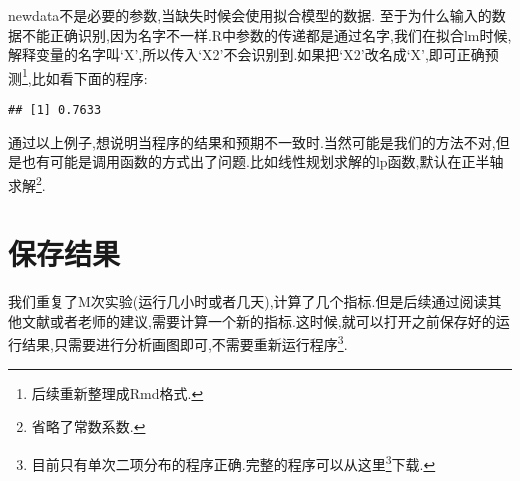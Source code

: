 \documentclass[]{ctexbook}
\newenvironment{Shaded}{\begin{snugshade}}{\end{snugshade}}
\newcommand{\DataTypeTok}[1]{\textcolor[rgb]{0.13,0.29,0.53}{#1}}
\newcommand{\DecValTok}[1]{\textcolor[rgb]{0.00,0.00,0.81}{#1}}
\newcommand{\FloatTok}[1]{\textcolor[rgb]{0.00,0.00,0.81}{#1}}
\newcommand{\KeywordTok}[1]{\textcolor[rgb]{0.13,0.29,0.53}{\textbf{#1}}}
\newcommand{\NormalTok}[1]{#1}
\newcommand{\OperatorTok}[1]{\textcolor[rgb]{0.81,0.36,0.00}{\textbf{#1}}}
\newcommand{\StringTok}[1]{\textcolor[rgb]{0.31,0.60,0.02}{#1}}
\renewcommand{\href}[2]{#2\footnote{\url{#1}}}
\begin{document}
newdata不是必要的参数,当缺失时候会使用拟合模型的数据.
至于为什么输入的数据不能正确识别,因为名字不一样.R中参数的传递都是通过名字,我们在拟合lm时候,解释变量的名字叫`X',所以传入`X2'不会识别到.如果把`X2'改名成`X',即可正确预测\footnote{后续重新整理成Rmd格式.},比如看下面的程序:

\begin{Shaded}
\end{Shaded}

\begin{verbatim}
## [1] 0.7633
\end{verbatim}

通过以上例子,想说明当程序的结果和预期不一致时.当然可能是我们的方法不对,但是也有可能是调用函数的方式出了问题.比如线性规划求解的lp函数,默认在正半轴求解\footnote{省略了常数系数.}.

\hypertarget{section-6}{%
\section{保存结果}\label{section-6}}

我们重复了M次实验(运行几小时或者几天),计算了几个指标.但是后续通过阅读其他文献或者老师的建议,需要计算一个新的指标.这时候,就可以打开之前保存好的运行结果,只需要进行分析画图即可,不需要重新运行程序\footnote{目前只有单次二项分布的程序正确.完整的程序可以从\href{code/glm.R}{这里}下载.}.
\end{document}
